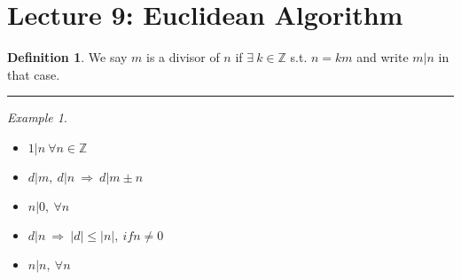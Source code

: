 \documentclass{article}
\theoremstyle{definition}
\newtheorem{definition}{Definition}[section]
\theoremstyle{remark}
\newtheorem*{example}{Example}
\begin{document}
\section{Lecture 9: Euclidean Algorithm}
\begin{definition}
	We say $m$ is a divisor of $n$ if $\exists ~k\in\mathbb{Z}$ s.t. $n=km$ and write $m|n$ in that case.\\
\end{definition}
\hrule
\vspace{2mm}
\begin{example}~
	\begin{itemize}
		\item $1|n~\forall n\in \mathbb{Z}$
		\item $d|m,~d|n ~\Rightarrow ~d|m\pm n$
		\item $n|0,~\forall n$
		\item $d|n ~\Rightarrow ~|d|\leq |n|,~if n\neq 0$
		\item $n|n,~\forall n$
	\end{itemize}
\end{example}
\end{document}
